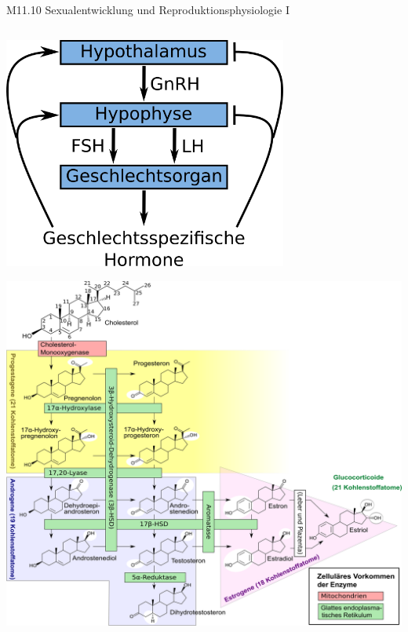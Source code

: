 \documentclass{beamer}
\begin{document}
\begin{frame}{M11.10 Sexualentwicklung und Reproduktionsphysiologie I}

\begin{columns}[c]

\begin{column}{5cm}

\begin{center}
\includegraphics[width=0.7\textwidth]{geschlechtshormone_achse.png}
\end{center}

\pause

\begin{center}
\includegraphics[width=\textwidth]{biosynthese_sexualhormone.png}
\end{center}




\end{column}
\end{columns}
\end{frame}
\end{document}
